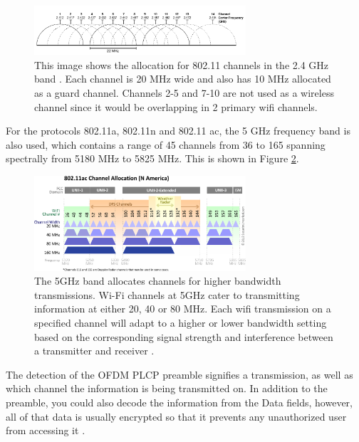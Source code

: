 \begin{figure}[ht]
\centering
\includegraphics[width=0.70\textwidth]{img/2_GHz_Channels.png}
\caption{This image shows the allocation for 802.11 channels in the 2.4 GHz band \cite{5ghzphoto}. Each channel is 20 MHz wide and also has 10 MHz allocated as a guard channel. Channels 2-5 and 7-10 are not used as a wireless channel since it would be overlapping in 2 primary wifi channels.}
\label{fig:2.4GHz_channel}
\end{figure} \par
For the protocols 802.11a, 802.11n and 802.11 ac, the 5 GHz frequency band is also used, which contains a range of 45 channels from 36 to 165 spanning spectrally from 5180 MHz to 5825 MHz.  This is shown in Figure \ref{fig:5GHz_channel}.
\begin{figure}[ht]
\centering
\includegraphics[width=0.70\textwidth]{img/5_GHz_Channels.png}
\caption{The 5GHz band allocates channels for higher bandwidth transmissions.  Wi-Fi channels at 5GHz cater to transmitting information at either 20, 40 or 80 MHz. Each wifi transmission on a specified channel will adapt to a higher or lower bandwidth setting based on the corresponding signal strength and interference between a transmitter and receiver \cite{5ghzphoto}.}
\label{fig:5GHz_channel}
\end{figure}
The detection of the OFDM PLCP preamble signifies a transmission, as well as which channel the information is being transmitted on. In addition to the preamble, you could also decode the information from the Data fields, however, all of that data is usually encrypted so that it prevents any unauthorized user from accessing it \cite{wifi_book}. 

